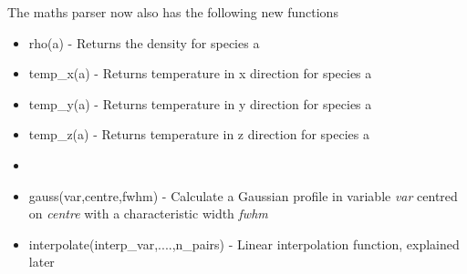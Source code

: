 \documentclass[12pt]{article}
\begin{document}
The maths parser now also has the following new functions
\begin{itemize}
\item rho(a) - Returns the density for species a
\item temp\_x(a) - Returns temperature in x direction for species a
\item temp\_y(a) - Returns temperature in y direction for species a
\item temp\_z(a) - Returns temperature in z direction for species a
\item 
\item gauss(var,centre,fwhm) - Calculate a Gaussian profile in variable {\it var} centred on {\it centre} with a characteristic width {\it fwhm}
\item interpolate(interp\_var,....,n\_pairs) - Linear interpolation function, explained later
\end{itemize}
\end{document}

